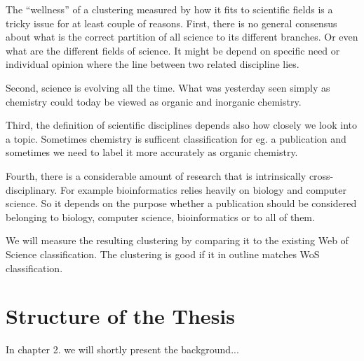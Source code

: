 The ``wellness'' of a clustering measured by how it fits to 
scientific fields is a tricky issue for at least couple of 
reasons.
First, there is no general consensus about what is the correct 
partition of all science to its different branches. Or even what
are the different fields of science. It might be depend 
on specific need or individual opinion where the line between two 
related discipline lies.

Second, science is evolving all the time. What was yesterday seen 
simply as chemistry could today be viewed as organic and inorganic 
chemistry.

Third, the definition of scientific disciplines depends also how 
closely we look into a topic. Sometimes chemistry is sufficent 
classification for eg. a publication and sometimes we need to label 
it more accurately as organic chemistry.

Fourth, there is a considerable amount of research that is 
intrinsically cross-disciplinary. For example bioinformatics relies
heavily on biology and computer science. So it depends on the 
purpose whether a publication should be considered belonging to
biology, computer science, bioinformatics or to all of them.

We will measure the resulting clustering by comparing it to the
existing Web of Science classification. The clustering is good if
it in outline matches WoS classification.




\section{Structure of the Thesis}
\label{section:structure} 

In chapter 2. we will shortly present the background...
